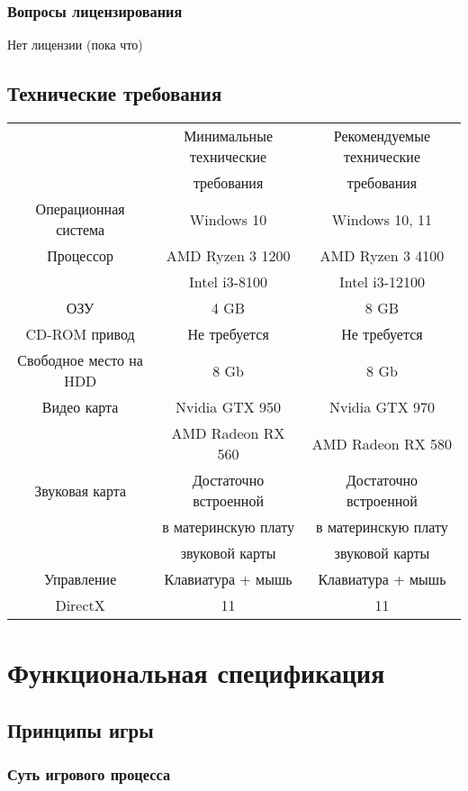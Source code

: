 \documentclass{article}
\begin{document}
\subsubsection{Вопросы лицензирования}

Нет лицензии (пока что)

\subsection{Технические требования}
\begin{center}
\begin{tabular}{ c | c | c }
 & Минимальные технические & Рекомендуемые технические \\ 
 & требования & требования \\ [2ex]
 Операционная система & Windows 10 & Windows 10, 11 \\ [2ex] 
 Процессор & AMD Ryzen 3 1200 & AMD Ryzen 3 4100 \\  
 & Intel i3-8100 & Intel i3-12100 \\ [2ex]
 ОЗУ & 4 GB & 8 GB \\ [2ex]
 CD-ROM привод & Не требуется & Не требуется \\ [2ex]
 Свободное место на HDD & 8 Gb & 8 Gb \\ [2ex]
 Видео карта & Nvidia GTX 950 & Nvidia GTX 970 \\
 & AMD Radeon RX 560 & AMD Radeon RX 580 \\ [2ex]
 Звуковая карта & Достаточно встроенной & Достаточно встроенной \\
 & в материнскую плату & в материнскую плату \\
 & звуковой карты & звуковой карты \\ [2ex]
 Управление & Клавиатура + мышь & Клавиатура + мышь \\ [2ex]
 DirectX & 11 & 11 \\
\end{tabular}
\end{center}

\section{Функциональная спецификация}

\subsection{Принципы игры}

\subsubsection{Суть игрового процесса}
\end{document}
